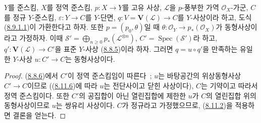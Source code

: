 \begin{proposition}[8.11.7]
\label{II.8.11.7-ko}
$Y$를 준스킴, $X$를 정역 준스킴, $p:X\to Y$를 고유 사상,
$\mathcal{L}$을 $p$-풍부한 가역 $\mathcal{O}_X$-가군, $C$를 정규
$Y$-준스킴, $\varepsilon:Y\to C$를 $Y$-단면,
$q:V=\mathbf{V}(\mathcal{L})\to C$를 $Y$-사상이라 하고, 도식
(\hyperref[II.8.9.1.1-ko]{8.9.1.1})이 가환한다고 하자. 또한
$p=(p_0,\theta)$일 때 $\theta:\mathcal{O}_Y\to p_*(\mathcal{O}_X)$가
동형사상이라고 가정하자. 이때
$\mathcal{S}'=\bigoplus_{n\geqslant0}p_*(\mathcal{L}^{\otimes n})$,
$C'=\operatorname{Spec}(\mathcal{S}')$라 하고,
$q':\mathbf{V}(\mathcal{L})\to C'$을 표준 $Y$-사상
(\hyperref[II.8.8.5-ko]{8.8.5})이라 하자. 그러면 $q=u\circ q'$을
만족하는 유일한 $Y$-사상 $u:C'\to C$는 동형사상이다.
\end{proposition}

\begin{proof}
(\hyperref[II.8.8.6-ko]{8.8.6})에서 $C'$이 정역 준스킴임이 따른다~;
$u$는 바탕공간의 위상동형사상 $C'\to C$이므로
((\hyperref[II.8.11.6-ko]{8.11.6})에 따라 $u$는 전단사이고 닫힌
사상이다), $C$는 기약이고 따라서 정역 준스킴이다. 또한 $C'$의
공집합이 아닌 열린집합에 제한한 $u$가 $C$의 열린집합 위의
동형사상이므로 $u$는 쌍유리 사상이다. $C$가 정규라고 가정했으므로,
(\hyperref[II.8.11.2-ko]{8.11.2})을 적용하면 결론을 얻는다.
\end{proof}

